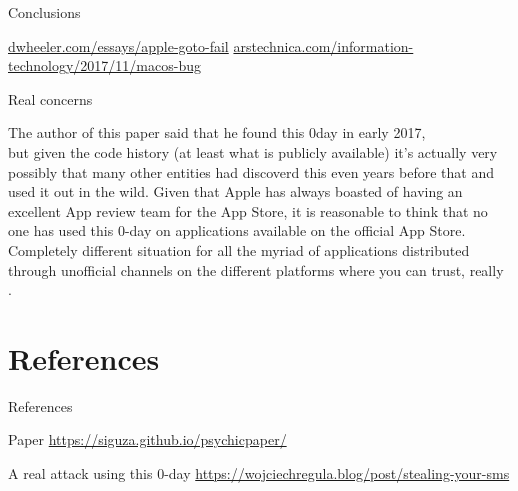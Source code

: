 \documentclass{beamer}
\begin{document}
\begin{frame}{Conclusions}
\begin{multicols}{2}
    \end{multicols}
\small\href{https://dwheeler.com/essays/apple-goto-fail.html}{dwheeler.com/essays/apple-goto-fail}
\small\href{https://arstechnica.com/information-technology/2017/11/macos-bug-lets-you-log-in-as-admin-with-no-password-required/}{arstechnica.com/information-technology/2017/11/macos-bug}
\end{frame}

\begin{frame}{Real concerns}
\begin{flushleft}
The author of this paper said that he found this 0day in early 2017,\\ but given the code history (at least what is publicly available) it's actually very possibly that many other entities had discoverd this even years before that and used it out in the wild.
\vfill
Given that Apple has always boasted of having an excellent App review team for the App Store, it is reasonable to think that no one has used this 0-day on applications available on the official App Store.
\vfill 
Completely different situation for all the myriad of applications distributed through unofficial channels on the different platforms where you can trust, really \color{red}{no one!}.
\end{flushleft}
\end{frame}

\section{References}
\begin{frame}[fragile]{References}
\begin{block}{Paper}
\href{https://siguza.github.io/psychicpaper/}{https://siguza.github.io/psychicpaper/}
\end{block}
\begin{block}{A real attack using this 0-day}
\href{https://wojciechregula.blog/post/stealing-your-sms-messages-with-ios-0day/}{https://wojciechregula.blog/post/stealing-your-sms}
\end{block}
\end{frame}
\end{document}
